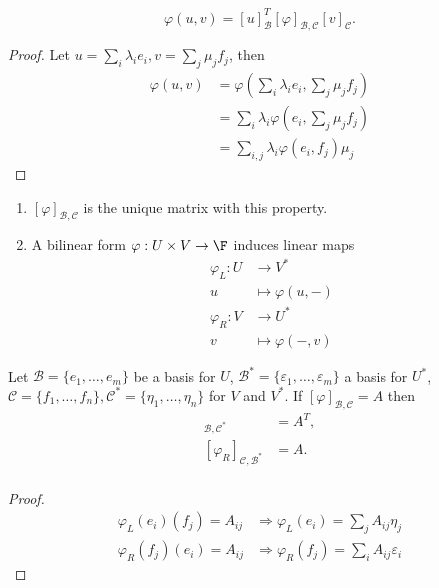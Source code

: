 \documentclass[a4paper]{article}
\newcommand*{\basis}{\mathcal}
\theoremstyle{definition}
\begin{document}
\begin{lemma}
  \[
    \varphi(u, v) = [u]_{\basis B}^T [\varphi]_{\basis B, \basis C} [v]_{\basis C}.
  \]
\end{lemma}

\begin{proof}
  Let \(u = \sum_{i}^{ }\lambda_ie_i, v = \sum_{j}^{} \mu_jf_j\), then
  \begin{align*}
    \varphi(u, v) &= \varphi\left( \sum_{i}^{ }\lambda_ie_i, \sum_{j}^{} \mu_jf_j \right) \\
                  &= \sum_{i}^{ }\lambda_i \varphi\left(e_i, \sum_{j}^{} \mu_jf_j \right)\\
                  &= \sum_{i, j}^{ }\lambda_i \varphi(e_i, f_j) \mu_j
  \end{align*}
\end{proof}

\begin{note}\leavevmode
  \begin{enumerate}
  \item \([\varphi]_{\basis B, \basis C}\) is the unique matrix with this property.
  \item A bilinear form \(\varphi: U \times V \to \F\) induces linear maps
    \begin{align*}
      \varphi_L: U &\to V^* \\
      u &\mapsto \varphi(u, -) \\
      \varphi_R: V &\to U^* \\
      v &\mapsto \varphi(-, v)
    \end{align*}
  \end{enumerate}
\end{note}

\begin{lemma}
  Let \(\basis B = \{e_1,\dots, e_m\}\) be a basis for \(U\), \(\basis B^* = \{\varepsilon_1,\dots, \varepsilon_m\}\) a basis for \(U^*\), \(\basis C = \{f_1,\dots, f_n\}, \basis C^* = \{\eta_1,\dots, \eta_n\}\) for \(V\) and \(V^*\). If \([\varphi]_{\basis B, \basis C} = A\) then
  \begin{align*}
    [\varphi_L]_{\basis B, \basis C^*} &= A^T, \\
    [\varphi_R]_{\basis C, \basis B^*} &= A. \\
  \end{align*}
\end{lemma}

\begin{proof}
  \begin{align*}
    \varphi_L(e_i)(f_j) = A_{ij} &\Longrightarrow \varphi_L(e_i) = \sum_{j}^{ }A_{ij}\eta_j \\
    \varphi_R(f_j)(e_i) = A_{ij} &\Longrightarrow \varphi_R(f_j) = \sum_{i}^{ }A_{ij}\varepsilon_i
  \end{align*}
\end{proof}
\end{document}
